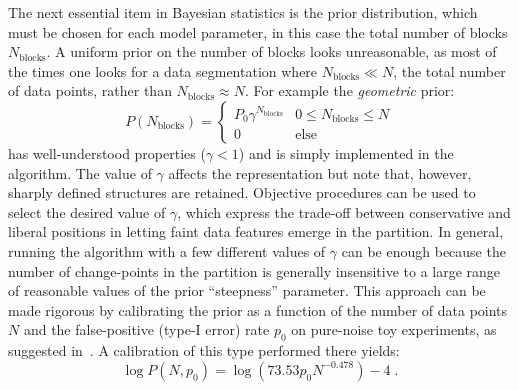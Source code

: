 The next essential item in Bayesian statistics is the prior distribution, which must be
chosen for each model parameter, in this case the total number of blocks
$N_\text{blocks}$. A uniform prior on the number of blocks looks unreasonable, as most of
the times one looks for a data segmentation where $N_\text{blocks} \ll N$, the total
number of data points, rather than $N_\text{blocks} \approx N$. For example the
\emph{geometric} prior:
\[
  P(N_\text{blocks}) =
  \begin{cases}
    P_0\gamma^{N_\text{blocks}} & 0 \le N_\text{blocks} \le N \\
    0                           & \text{else}
  \end{cases}
\]
has well-understood properties ($\gamma < 1$) and is simply implemented in the algorithm.
The value of $\gamma$ affects the representation but note that, however, sharply defined
structures are retained. Objective procedures can be used to select the desired value of
$\gamma$, which express the trade-off between conservative and liberal positions in
letting faint data features emerge in the partition. In general, running the algorithm
with a few different values of $\gamma$ can be enough because the number of change-points
in the partition is generally insensitive to a large range of reasonable values of the
prior ``steepness'' parameter. This approach can be made rigorous by calibrating the prior
as a function of the number of data points $N$ and the false-positive (type-I error) rate
$p_0$ on pure-noise toy experiments, as suggested in~\cite{Scargle2012}. A calibration of
this type performed there yields:
\[
  \log P(N, p_0) = \log(73.53 p_0 N^{-0.478}) - 4 \;.
\]

